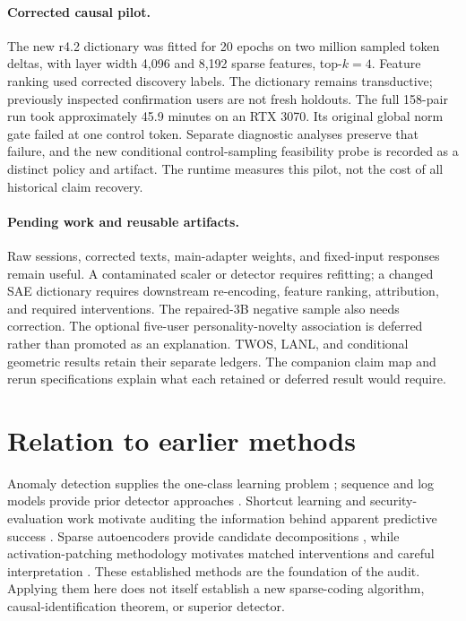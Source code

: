 \paragraph{Corrected causal pilot.}
The new r4.2 dictionary was fitted for 20 epochs on two million sampled token
deltas, with layer width 4,096 and 8,192 sparse features, top-$k=4$. Feature
ranking used corrected discovery labels. The dictionary remains transductive;
previously inspected confirmation users are not fresh holdouts. The full
158-pair run took approximately 45.9 minutes on an RTX 3070. Its original global
norm gate failed at one control token. Separate diagnostic analyses preserve
that failure, and the new conditional control-sampling feasibility probe is
recorded as a distinct policy and artifact. The runtime measures this pilot,
not the cost of all historical claim recovery.

\paragraph{Pending work and reusable artifacts.}
Raw sessions, corrected texts, main-adapter weights, and fixed-input responses
remain useful. A contaminated scaler or detector requires refitting; a changed
SAE dictionary requires downstream re-encoding, feature ranking, attribution,
and required interventions. The repaired-3B negative sample also needs correction.
The optional five-user personality-novelty association is deferred rather than
promoted as an explanation. TWOS, LANL, and conditional geometric results retain
their separate ledgers. The companion claim map and rerun specifications explain
what each retained or deferred result would require.

\section{Relation to earlier methods}
\label{app:related}
Anomaly detection supplies the one-class learning problem
\citep{chandola2009anomaly}; sequence and log models provide prior detector
approaches \citep{du2017deeplog,tuor2018recurrent,guo2021logbert}. Shortcut
learning and security-evaluation work motivate auditing the information behind
apparent predictive success \citep{geirhos2020shortcut,lapuschkin2019unmasking,arp2022dos,landauer2024critical}.
Sparse autoencoders provide candidate decompositions
\citep{cunningham2023sparse,gao2024scaling}, while activation-patching methodology
motivates matched interventions and careful interpretation
\citep{zhang2023best,heimersheim2024use}. These established methods are the
foundation of the audit. Applying them here does not itself establish a new
sparse-coding algorithm, causal-identification theorem, or superior detector.
